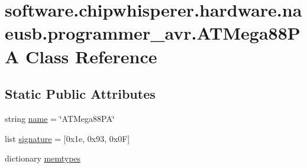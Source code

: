 \hypertarget{classsoftware_1_1chipwhisperer_1_1hardware_1_1naeusb_1_1programmer__avr_1_1ATMega88PA}{}\section{software.\+chipwhisperer.\+hardware.\+naeusb.\+programmer\+\_\+avr.\+A\+T\+Mega88\+P\+A Class Reference}
\label{classsoftware_1_1chipwhisperer_1_1hardware_1_1naeusb_1_1programmer__avr_1_1ATMega88PA}
\subsection*{Static Public Attributes}
\begin{DoxyCompactItemize}
\item 
string \hyperlink{classsoftware_1_1chipwhisperer_1_1hardware_1_1naeusb_1_1programmer__avr_1_1ATMega88PA_ab24a0e8314553eff75a747f4d671b766}{name} = \char`\"{}A\+T\+Mega88\+P\+A\char`\"{}
\item 
list \hyperlink{classsoftware_1_1chipwhisperer_1_1hardware_1_1naeusb_1_1programmer__avr_1_1ATMega88PA_a0e3412ed434488062014bba19ef137bc}{signature} = \mbox{[}0x1e, 0x93, 0x0\+F\mbox{]}
\item 
dictionary \hyperlink{classsoftware_1_1chipwhisperer_1_1hardware_1_1naeusb_1_1programmer__avr_1_1ATMega88PA_a361a12da79ec952db38249b8f058ede8}{memtypes}
\end{DoxyCompactItemize}



